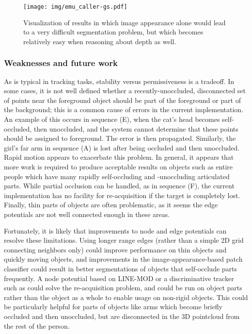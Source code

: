 \documentclass[journal]{IEEEtran}
\begin{document}
\begin{figure*}
  \centering
  \texttt{[image: img/emu\_caller-gs.pdf]}
  \caption{Visualization of results in which image appearance alone would lead to a very difficult segmentation problem, but which becomes relatively easy when reasoning about depth as well.}
  \label{fig:emu}
\end{figure*}

\subsubsection{Weaknesses and future work}

As is typical in tracking tasks, stability versus permissiveness is a tradeoff.  In some cases, it is not well defined whether a recently-unoccluded, disconnected set of points near the foreground object should be part of the foreground or part of the background; this is a common cause of errors in the current implementation.  An example of this occurs in sequence (E), when the cat's head becomes self-occluded, then unoccluded, and the system cannot determine that these points should be assigned to foreground.  The error is then propagated.  Similarly, the girl's far arm in sequence (A) is lost after being occluded and then unoccluded.  Rapid motion appears to exacerbate this problem.  In general, it appears that more work is required to produce acceptable results on objects such as entire people which have many rapidly self-occluding and -unoccluding articulated parts.  While partial occlusion can be handled, as in sequence (F), the current implementation has no facility for re-acquisition if the target is completely lost.  Finally, thin parts of objects are often problematic, as it seems the edge potentials are not well connected enough in these areas.

Fortunately, it is likely that improvements to node and edge potentials can resolve these limitations.  Using longer range edges (rather than a simple 2D grid connecting neighbors only) could improve performance on thin objects and quickly moving objects, and improvements in the image-appearance-based patch classifier could result in better segmentations of objects that self-occlude parts frequently.  A node potential based on LINE-MOD or a discriminative tracker such as \cite{kalal2010a} could solve the re-acquisition problem, and could be run on object parts rather than the object as a whole to enable usage on non-rigid objects.  This could be particularly helpful for parts of objects like arms which become briefly occluded and then unoccluded, but are disconnected in the 3D pointcloud from the rest of the person.
\end{document}
